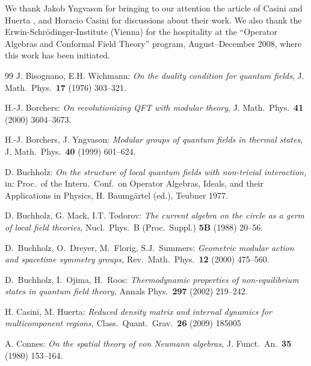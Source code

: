 \documentclass[12pt]{article}
\begin{document}
\medskip

 We thank Jakob Yngvason for bringing
to our attention the article of Casini and Huerta \cite{CH}, and
Horacio Casini for discussions about their work. We also thank the 
Erwin-Schr\"odinger-Institute (Vienna) for the hospitality at the 
``Operator Algebras and Conformal Field Theory'' program,
August--December 2008, where this work has been initiated.


\begin{thebibliography}{99} \small \itemsep-1.1mm 
 J. Bisognano, E.H. Wichmann:
 {\it On the duality condition for quantum fields},
 J. Math.\ Phys.\ {\bf 17} (1976) 303--321.

 H.-J. Borchers:
 {\it On revolutionizing QFT with modular theory},
 J. Math.\ Phys.\ {\bf 41} (2000) 3604--3673.


 H.-J. Borchers, J. Yngvason:
 {\it Modular groups of quantum fields in thermal states},
 J. Math.\ Phys.\ {\bf 40} (1999) 601--624.
 
 D. Buchholz: 
 {\it On the structure of local quantum fields with non-trivial
 interaction,} in: Proc.\ of the Intern.\ Conf.\ on Operator
 Algebras, Ideals, and their Applications in Physics, H. Baumgärtel
 (ed.), Teubner 1977.

 D. Buchholz, G. Mack, I.T. Todorov: 
 {\it The current algebra on the circle as a germ of local field theories,}
 Nucl.\ Phys.\ B (Proc.\ Suppl.) {\bf 5B} (1988) 20--56. 

 D.~Buchholz, O.~Dreyer, M.~Florig, S.J.~Summers:
 {\it Geometric modular action and spacetime symmetry groups,}
  Rev.\ Math.\ Phys.\  {\bf 12} (2000) 475--560.

 D.~Buchholz, I.~Ojima, H.~Roos:
 {\it Thermodynamic properties of non-equilibrium states in quantum
 field theory,}
 Annals Phys.\  {\bf 297} (2002) 219--242.

 H. Casini, M. Huerta: 
 {\it Reduced density matrix and internal dynamics for multicomponent regions,}
 Class.\ Quant.\ Grav.\  {\bf 26} (2009) 185005 

 A. Connes:
 {\it On the spatial theory of von Neumann algebras,}
 J. Funct.\ An.\ {\bf 35} (1980) 153--164.


\end{thebibliography}
\end{document}
